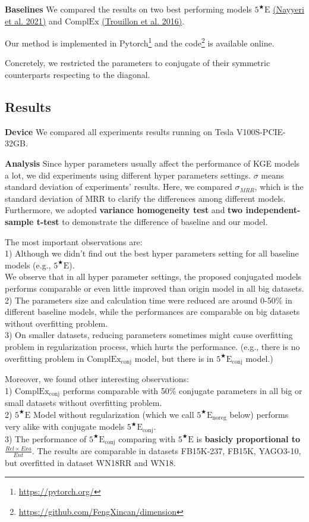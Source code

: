 \documentclass[9pt]{ctexart}
\theoremstyle{definition}
\begin{document}
\textbf{Baselines} We compared the results on two best performing models $5^{\bigstar}\mathrm{E}$
\hyperlink{Nay21}{(Nayyeri et al. 2021)}
and $\mathrm{ComplEx}$
\hyperlink{Tro16}{(Trouillon et al. 2016)}.

Our method is implemented in Pytorch\footnote{\url{https://pytorch.org/}} and the code\footnote{\url{https://github.com/FengXincan/dimension}} is available online.

Concretely, we restricted the parameters to conjugate of their symmetric counterparts respecting to the diagonal.

\subsection{Results}
\textbf{Device} We compared all experiments results running on Tesla V100S-PCIE-32GB.

\textbf{Analysis} Since hyper parameters usually affect the performance of KGE models a lot, we did experiments using different hyper parameters settings. 
$\sigma$ means standard deviation of experiments' results.
Here, we compared $\sigma_{MRR}$, which is the standard deviation of MRR to clarify the differences among different models.
Furthermore, we adopted \textbf{variance homogeneity test} and \textbf{two independent-sample t-test} to demonstrate the difference of baseline and our model.

The most important observations are:\\
1) Although we didn't find out the best hyper parameters setting for all baseline models (e.g., $5^{\bigstar}\mathrm{E}$). \\
We observe that in all hyper parameter settings, the proposed conjugated models performs comparable or even little improved than origin model in all big datasets.\\
2) The parameters size and calculation time were reduced are around 0-50\% in different baseline models, while the performances are comparable on big datasets without overfitting problem. \\
3) On smaller datasets, reducing parameters sometimes might cause overfitting problem in regularization process, which hurts the performance. 
(e.g., there is no overfitting problem in $\mathrm{ComplEx_{conj}}$ model, but there is in $5^{\bigstar}\mathrm{E_{conj}}$ model.)

Moreover, we found other interesting observations:\\
1) $\mathrm{ComplEx_{conj}}$ performs comparable with 50\% conjugate parameters in all big or small datasets without overfitting problem.\\
2) $5^{\bigstar}\mathrm{E}$ Model without regularization (which we call $5^{\bigstar}\mathrm{E_{noreg}}$ below) performs very alike with conjugate models $5^{\bigstar}\mathrm{E_{conj}}$.\\
3) The performance of $5^{\bigstar}\mathrm{E_{conj}}$ comparing with $5^{\bigstar}\mathrm{E}$ is \textbf{basicly proportional to} $\frac{Rel\times Exa}{Ent}$. 
The results are comparable in datasets FB15K-237, FB15K, YAGO3-10, but overfitted in dataset WN18RR and WN18.
\end{document}
